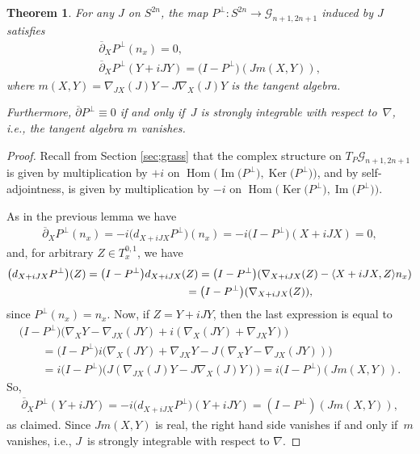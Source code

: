\documentclass[11pt]{article}
\newtheorem{thm}{Theorem}[section]
\numberwithin{equation}{section}
\newcommand{\cG}{{\mathcal G}}
\begin{document}
\begin{thm} \label{thm;delbarPperp}
For any $J$ on $S^{2n}$, the map $P^\perp\colon S^{2n} \to \cG_{n+1,2n+1}$ induced by $J$ satisfies
\begin{gather*}
\overline{\partial}_X P^\perp (n_x) = 0, \\
\overline{\partial}_X P^\perp (Y+iJY) = \big( I - P^\perp\big) (J m(X,Y)),
\end{gather*}
where $m(X,Y) = \nabla_{JX} (J)Y - J \nabla_X (J) Y$ is the tangent algebra.

Furthermore, $\overline{\partial} P^\perp \equiv 0$ if and only if~$J $ is strongly integrable with respect to~$\nabla$, i.e., the tangent algebra $m$ vanishes.
\end{thm}

\begin{proof}Recall from Section \ref{sec;grass} that the complex structure on $T_P \cG_{n+1,2n+1}$ is given by multiplication by $+i$ on $\operatorname{Hom}\big(\operatorname{Im}\big(P^\perp\big), \operatorname{Ker}\big(P^\perp\big)\big)$, and by self-adjointness, is given by multiplication by $-i$ on $\operatorname{Hom}\big(\operatorname{Ker}\big(P^\perp\big),\operatorname{Im}\big(P^\perp\big)\big)$.

As in the previous lemma we have
\begin{gather*}
 \overline{\partial}_X P^\perp (n_x) = -i \big( d_{X+iJX} P^\perp \big) (n_x) = -i \big(I-P^\perp\big)(X+iJX) = 0,
\end{gather*}
and, for arbitrary $Z \in T^{0,1}_x$, we have
\begin{gather*}
\big( d_{X+iJX} P^\perp \big) (Z) = \big(I-P^\perp\big) d_{X+iJX} (Z)= \big(I-P^\perp\big) ( \nabla_{X+iJX} (Z) - \langle X+iJX, Z \rangle n_x ) \\
\hphantom{\big( d_{X+iJX} P^\perp \big) (Z)}{} = \big(I-P^\perp\big) ( \nabla_{X+iJX} (Z) ),
 \end{gather*}
 since $P^\perp(n_x) = n_x$. Now, if $Z= Y+iJY$, then the last expression is equal to
 \begin{gather*}
 \big(I -P^\perp\big) \big( \nabla_X Y - \nabla_{JX} (JY) + i ( \nabla_X(JY) + \nabla_{JX} Y ) \big) \\
 \qquad{} = \big(I -P^\perp\big) i \big( \nabla_X(JY) + \nabla_{JX} Y - J(\nabla_X Y - \nabla_{JX} (JY)) \big) \\
 \qquad {}= i \big(I -P^\perp\big) \big( J ( \nabla_{JX} (J) Y - J\nabla_X(J) Y ) \big) = i \big(I - P^\perp\big) ( J m(X,Y) ).
\end{gather*}
 So,
\begin{gather*}
\overline{\partial}_X P^\perp (Y+iJY) = -i \big( d_{X+iJX} P^\perp \big) (Y + iJY) = ( I - P^\perp) ( J m(X,Y) ),
\end{gather*}
as claimed. Since $ J m(X,Y)$ is real, the right hand side vanishes if and only if~$m$ vanishes, i.e., $J $~is strongly integrable with respect to $\nabla$.


\end{proof}
\end{document}
